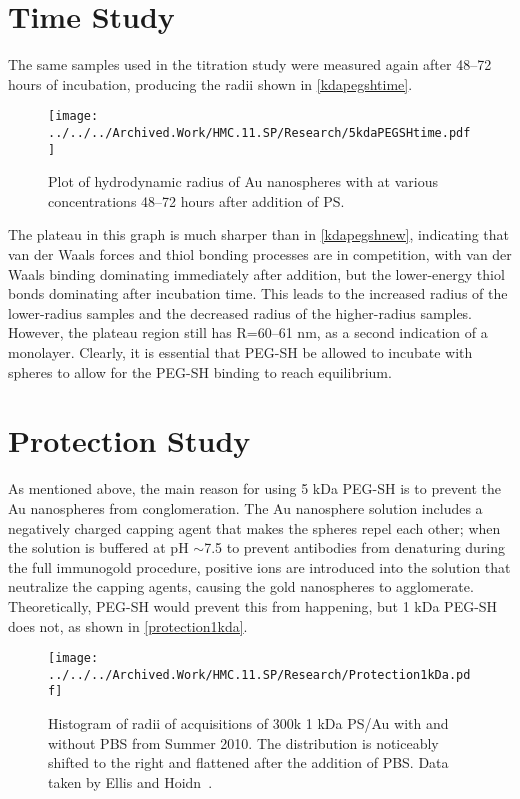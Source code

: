 \section{Time Study}
\label{timestudy}

The same samples used in the titration study were measured again after 48--72 hours of incubation, producing the radii shown in \autoref{kdapegshtime}.

\begin{figure}[htbp]
\centering
\texttt{[image: ../../../Archived.Work/HMC.11.SP/Research/5kdaPEGSHtime.pdf]}
\caption{Plot of hydrodynamic radius of Au nanospheres with at various concentrations 48--72 hours after addition of PS.}
\label{kdapegshtime}
\end{figure}



The plateau in this graph is much sharper than in \autoref{kdapegshnew}, indicating that van der Waals forces and thiol bonding processes are in competition, with van der Waals binding dominating immediately after addition, but the lower-energy thiol bonds dominating after incubation time. This leads to the increased radius of the lower-radius samples and the decreased radius of the higher-radius samples. However, the plateau region still has R=60--61 nm, as a second indication of a monolayer. Clearly, it is essential that PEG-SH be allowed to incubate with spheres to allow for the PEG-SH binding to reach equilibrium.

\section{Protection Study}
\label{protectionstudy}

As mentioned above, the main reason for using 5 kDa PEG-SH is to prevent the Au nanospheres from conglomeration. The Au nanosphere solution includes a negatively charged capping agent that makes the spheres repel each other; when the solution is buffered at pH \ensuremath{\sim}7.5 to prevent antibodies from denaturing during the full immunogold procedure, positive ions are introduced into the solution that neutralize the capping agents, causing the gold nanospheres to agglomerate. Theoretically, PEG-SH would prevent this from happening, but 1 kDa PEG-SH does not, as shown in \autoref{protection1kda}.

\begin{figure}[htbp]
\centering
\texttt{[image: ../../../Archived.Work/HMC.11.SP/Research/Protection1kDa.pdf]}
\caption{Histogram of radii of acquisitions of 300k 1 kDa PS\slash Au with and without PBS from Summer 2010. The distribution is noticeably shifted to the right and flattened after the addition of PBS. Data taken by Ellis and Hoidn~\citep{hoidnellis}.}
\label{protection1kda}
\end{figure}



